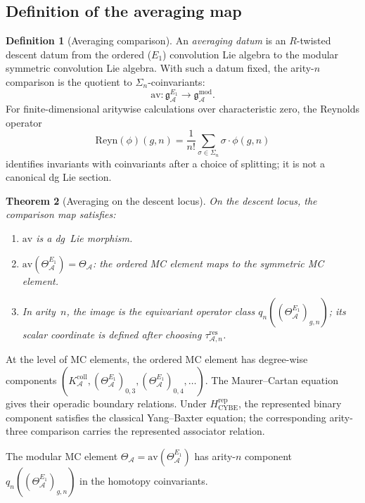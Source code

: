 \documentclass[11pt,reqno]{amsart}
\newtheorem{theorem}{Theorem}[section]
\theoremstyle{definition}
\newtheorem{definition}[theorem]{Definition}
\theoremstyle{remark}
\newcommand{\cA}{\mathcal{A}}
\newcommand{\gmod}{\mathfrak{g}^{\mathrm{mod}}_\cA}
\newcommand{\gEone}{\mathfrak{g}^{E_1}_\cA}
\newcommand{\Eone}{E_1}
\newcommand{\av}{\mathrm{av}}
\numberwithin{equation}{section}
\begin{document}
\subsection{Definition of the averaging map}

\begin{definition}[Averaging comparison]\label{def:av}
An \emph{averaging datum} is an $R$-twisted descent datum from the
ordered ($\Eone$) convolution Lie algebra to the modular symmetric
convolution Lie algebra. With such a datum fixed, the arity-$n$
comparison is the quotient to $\Sigma_n$-coinvariants:
\begin{equation}\label{eq:av-def}
\av\colon \gEone \longrightarrow \gmod.
\end{equation}
For finite-dimensional aritywise calculations over characteristic
zero, the Reynolds operator
\[
\mathrm{Reyn}(\phi)(g,n)=\frac1{n!}\sum_{\sigma\in\Sigma_n}
\sigma\cdot\phi(g,n)
\]
identifies invariants with coinvariants after a choice of splitting;
it is not a canonical dg Lie section.
\end{definition}

\begin{theorem}[Averaging on the descent locus]\label{thm:av-properties}
On the descent locus, the comparison map satisfies:
\begin{enumerate}[\upshape(i)]
\item $\av$ is a dg~Lie morphism.
\item $\av(\Theta^{\Eone}_\cA) = \Theta_\cA$: the ordered
 MC element maps to the symmetric MC element.
\item In arity~$n$, the image is the equivariant operator class
 $q_n((\Theta_\cA^{\Eone})_{g,n})$; its scalar coordinate is defined
 after choosing $\tau_{\cA,n}^{\mathrm{res}}$.
\end{enumerate}
\end{theorem}

At the level of MC elements, the ordered MC element has degree-wise
components
$(K_\cA^{\mathrm{coll}},(\Theta_\cA^{\Eone})_{0,3},
(\Theta_\cA^{\Eone})_{0,4},\ldots)$.  The Maurer--Cartan equation gives
their operadic boundary relations.  Under
$H_{\mathrm{CYBE}}^{\mathrm{rep}}$, the represented binary component
satisfies the classical Yang--Baxter equation; the corresponding
arity-three comparison carries the represented associator relation.

The modular MC element $\Theta_\cA=\av(\Theta^{\Eone}_\cA)$ has
arity-$n$ component $q_n((\Theta_\cA^{\Eone})_{g,n})$ in the homotopy
coinvariants.
\end{document}
